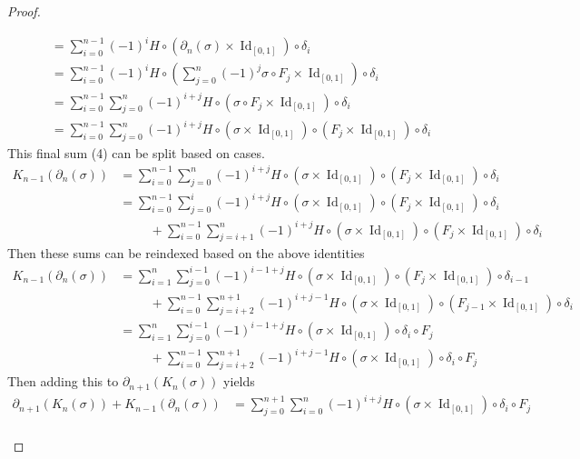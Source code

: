 \documentclass{article}
\newcommand{\id}[1]{\operatorname{Id}_{#1}}
\begin{document}
\begin{proof}
\begin{enumerate}[a.]
\begin{align}
      &= \sum_{i=0}^{n-1} (-1)^{i} H\circ(\partial_n(\sigma) \times \id{[0,1]}) \circ \delta_i \\
      &= \sum_{i=0}^{n-1} (-1)^{i} H\circ\left(\sum_{j=0}^n(-1)^j\sigma \circ F_j \times \id{[0,1]}\right) \circ \delta_i \\
      &= \sum_{i=0}^{n-1}\sum_{j=0}^n (-1)^{i+j} H\circ\left(\sigma \circ F_j \times \id{[0,1]}\right) \circ \delta_i \\
      &= \sum_{i=0}^{n-1}\sum_{j=0}^n (-1)^{i+j} H\circ(\sigma \times \id{[0,1]}) \circ (F_j \times \id{[0,1]}) \circ \delta_i
    \end{align}
    This final sum (4) can be split based on cases.
    \begin{align}
      K_{n-1}(\partial_{n}(\sigma))
      &=\sum_{i=0}^{n-1}\sum_{j=0}^n (-1)^{i+j} H\circ(\sigma \times \id{[0,1]}) \circ (F_j \times \id{[0,1]}) \circ \delta_i \\
      &= \sum_{i=0}^{n-1}\sum_{j=0}^i (-1)^{i+j} H\circ(\sigma \times \id{[0,1]}) \circ (F_j \times \id{[0,1]}) \circ \delta_i \\
      &\hspace{1cm}+ \sum_{i=0}^{n-1}\sum_{j=i+1}^n (-1)^{i+j} H\circ(\sigma \times \id{[0,1]}) \circ (F_j \times \id{[0,1]}) \circ \delta_i
    \end{align}
    Then these sums can be reindexed based on the above identities \begin{align}
      K_{n-1}(\partial_{n}(\sigma))
      &= \sum_{i=1}^{n}\sum_{j=0}^{i-1} (-1)^{i-1+j} H\circ(\sigma \times \id{[0,1]}) \circ (F_j \times \id{[0,1]}) \circ \delta_{i-1}\\
      &\hspace{1cm}+ \sum_{i=0}^{n-1}\sum_{j=i+2}^{n+1} (-1)^{i+j-1} H\circ(\sigma \times \id{[0,1]}) \circ (F_{j-1} \times \id{[0,1]}) \circ \delta_i\\
      &= \sum_{i=1}^{n}\sum_{j=0}^{i-1} (-1)^{i-1+j} H\circ(\sigma \times \id{[0,1]}) \circ \delta_i \circ F_j\\
      &\hspace{1cm}+ \sum_{i=0}^{n-1}\sum_{j=i+2}^{n+1} (-1)^{i+j-1} H\circ(\sigma \times \id{[0,1]}) \circ \delta_i \circ F_j
    \end{align}
    Then adding this to $\partial_{n+1}(K_n(\sigma))$ yields \begin{align}
      \partial_{n+1}(K_n(\sigma)) + K_{n-1}(\partial_{n}(\sigma))
      &= \sum_{j=0}^{n+1}\sum_{i=0}^{n} (-1)^{i + j} H\circ(\sigma \times \id{[0,1]}) \circ \delta_i \circ F_j \\

\end{align}
\end{enumerate}
\end{proof}
\end{document}
